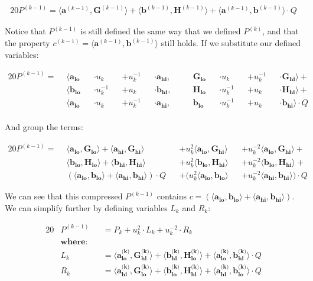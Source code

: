 \documentclass{article}
\newcommand{\eq}[1]{\begin{alignat*}{20}#1\end{alignat*}}
\renewcommand{\vec}[1]{\boldsymbol{#1}}
\newcommand{\dotp}[2]{\langle #1, #2 \rangle}
\newcommand{\opn}[1]{\operatorname{#1}}
\newcommand{\veclo}[1]{\vec{#1_{\opn{lo}}}}
\newcommand{\vechi}[1]{\vec{#1_{\opn{hi}}}}
\begin{document}
\eq{
	P^{(k-1)} =
	\dotp{\vec{a}^{(k-1)}}{\vec{G}^{(k-1)}} +
	\dotp{\vec{b}^{(k-1)}}{\vec{H}^{(k-1)}} +
	\dotp{\vec{a}^{(k-1)}}{\vec{b}^{(k-1)}} \cdot Q
}

Notice that $P^{(k-1)}$ is still defined the same way
that we defined $P^{(k)}$, and that the property $c^{(k-1)} =
\dotp{\vec{a}^{(k-1)}}{\vec{b}^{(k-1)}}$ still holds. If we substitute
our defined variables:

\eq{
	P^{(k-1)} = \: \:
	&\dotp
		{        \veclo{a} &&\cdot u_k      &&+ u_k^{-1} &&\cdot \vechi{a}}
		{&&\quad \veclo{G} &&\cdot u_k      &&+ u_k^{-1} &&\cdot \vechi{G}}
	+ \\
	&\dotp
		{        \veclo{b} &&\cdot u_k^{-1} &&+ u_k      &&\cdot \vechi{b}}
		{&&\quad \veclo{H} &&\cdot u_k^{-1} &&+ u_k      &&\cdot \vechi{H}}
	+ \\
	&\dotp
		{        \veclo{a} &&\cdot u_k      &&+ u_k^{-1} &&\cdot \vechi{a}}
		{&&\quad \veclo{b} &&\cdot u_k^{-1} &&+ u_k      &&\cdot \vechi{b}}
	\cdot Q \\
}

And group the terms:

\eq{
	P^{(k-1)} = \: \:
	        &\dotp{\veclo{a}}{\veclo{G}}            +
	         \dotp{\vechi{a}}{\vechi{G}}          &&+
	u^2_k    \dotp{\veclo{a}}{\vechi{G}}          &&+
	u^{-2}_k \dotp{\veclo{a}}{\vechi{G}}            +\\
	        &\dotp{\veclo{b}}{\veclo{H}}            +
	         \dotp{\vechi{b}}{\vechi{H}}          &&+
	u^2_k    \dotp{\veclo{b}}{\vechi{H}}          &&+
	u^{-2}_k \dotp{\veclo{b}}{\vechi{H}}            +\\
	       &(\dotp{\veclo{a}}{\veclo{b}}            +
		       \dotp{\vechi{a}}{\vechi{b}}) \cdot Q &&+
	(u^2_k   \dotp{\veclo{a}}{\veclo{b}}          &&+
	u^{-2}_k \dotp{\vechi{a}}{\vechi{b}}) \cdot Q
}

We can see that this compressed $P^{(k-1)}$ contains $c =
(\dotp{\veclo{a}}{\veclo{b}} + \dotp{\vechi{a}}{\vechi{b}})$. We can
simplify further by defining variables $L_k$ and $R_k$:

\eq{
	&P^{(k-1)} &&= P_k + u^2_k \cdot L_k + u^{-2}_k \cdot R_k \\
	&\textbf{where:} \\
	&L_k     &&= \dotp{\veclo{a^{\text{(k)}}}}{\vechi{G^{\text{(k)}}}} +
	             \dotp{\vechi{b^{\text{(k)}}}}{\veclo{H^{\text{(k)}}}} + 
	             \dotp{\veclo{a^{\text{(k)}}}}{\vechi{b^{\text{(k)}}}} \cdot Q \\
	&R_k     &&= \dotp{\vechi{a^{\text{(k)}}}}{\veclo{G^{\text{(k)}}}} +
	             \dotp{\veclo{b^{\text{(k)}}}}{\vechi{H^{\text{(k)}}}} +
	             \dotp{\vechi{a^{\text{(k)}}}}{\veclo{b^{\text{(k)}}}} \cdot Q \\
}
\end{document}
